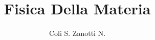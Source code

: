 \documentclass[12pt, a4paper]{book}
\begin{document}
\title{Fisica Della Materia}
\author{Coli S. Zanotti N.}
\maketitle


\end{document}
